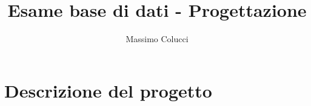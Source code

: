 \documentclass[12pt,a4paper]{article}
\begin{document}
\title{Esame base di dati - Progettazione}
\author{Massimo Colucci}

\maketitle


\chapter{Descrizione del progetto}
\end{document}
